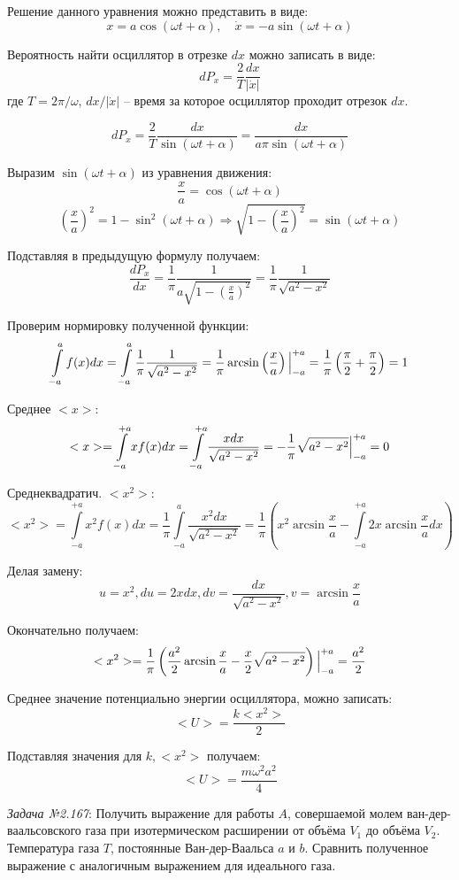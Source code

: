 \documentclass[14pt,final,titlepage]{hedsemwork}
\begin{document}
Решение данного уравнения можно представить в виде:
\[
	x = a\cos(\omega t + \alpha), \quad
	\dot{x} = -a\sin(\omega t + \alpha)
\]

Вероятность найти осциллятор в отрезке \( dx \) можно записать в виде:
\[
	dP_x = \frac{2}{T}\frac{dx}{|\dot{x}|}
\]
где \( T = 2\pi/\omega \), \( dx / |\dot{x}| \) -- время за которое 
осциллятор проходит отрезок \( dx \).

\[
	dP_x = \frac{2}{T}\frac{dx}{\sin(\omega t + \alpha)} = 
		\frac{dx}{a\pi\sin(\omega t + \alpha)}
\]

Выразим \( \sin(\omega t + \alpha )\) из уравнения движения:
\[
	\frac{x}{a} = \cos(\omega t + \alpha)
\]
\[
	\left( \frac{x}{a} \right)^2 = 1 - \sin^2(\omega t + \alpha) 
		\Rightarrow \sqrt{1-\left( \frac{x}{a} \right)^2} = 
		\sin(\omega t + \alpha)
\]

Подставляя в предыдущую формулу получаем:
\[
	\frac{dP_x}{dx} = \frac{1}{\pi}
		\frac{1}{a\sqrt{1-\left( \frac{x}{a} \right)^2}} = 
		\frac{1}{\pi}\frac{1}{\sqrt{a^2-x^2}}
\]

Проверим нормировку полученной функции:
\[
	\int\limits_{-a}^{a} f(x)dx = 
		\int\limits_{-a}^{a} \frac{1}{\pi}\frac{1}{\sqrt{a^2-x^2}} = 
		\frac{1}{\pi}\arcsin\left( \frac{x}{a} \right) 
		\Big{|}_{-a}^{+a} = \frac{1}{\pi}
		\left( \frac{\pi}{2} + \frac{\pi}{2} \right) = 1
\]

Среднее \( <x> \):
\[
	<x> = \int\limits_{-a}^{+a} xf(x)dx = 
		\int\limits_{-a}^{+a} \frac{xdx}{\sqrt{a^2-x^2}} = 
		-\frac{1}{\pi}\sqrt{a^2-x^2}\Big{|}_{-a}^{+a} = 0 
\]

Среднеквадратич. \( <x^2> \):
\[
	<x^2> = \int\limits_{-a}^{+a} x^2f(x)dx =
		\frac{1}{\pi}\int\limits_{-a}^{a} 
		\frac{x^2dx}{\sqrt{a^2-x^2}} = 
		\frac{1}{\pi}\left( x^2\arcsin\frac{x}{a} - 
		\int\limits_{-a}^{+a} 2x \arcsin\frac{x}{a} dx \right)
\]

Делая замену:
\[
	u = x^2, du = 2xdx, dv = \frac{dx}{\sqrt{a^2-x^2}}, 
	v = \arcsin\frac{x}{a}
\]

Окончательно получаем:
\[
	<x^2> = \frac{1}{\pi} \left( 
		\frac{a^2}{2}\arcsin\frac{x}{a} - 
		\frac{x}{2}\sqrt{a^2-x^2} \right)\Big{|}_{-a}^{+a} = 
		\frac{a^2}{2}
\]

Среднее значение потенциально энергии осциллятора, можно записать:
\[
	<U> = \frac{k<x^2>}{2}
\]

Подставляя значения для \( k, <x^2> \) получаем:
\[
	<U> = \frac{m\omega^2 a^2}{4}
\]

\newpage
\emph{Задача №2.167}: Получить выражение для работы \( A \), совершаемой 
молем ван-дер-ваальсовского газа при изотермическом расширении от объёма 
\( V_1 \) до объёма \( V_2 \). Температура газа \( T \), постоянные 
Ван-дер-Ваальса \( a \) и \( b \). Сравнить полученное выражение с 
аналогичным выражением для идеального газа.
\end{document}
